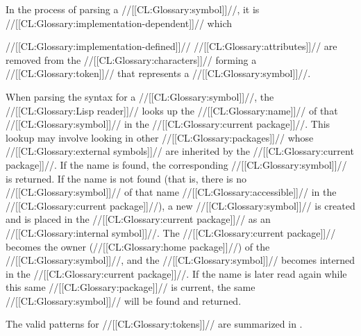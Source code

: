 { In the process of parsing a //[[CL:Glossary:symbol]]//, it is //[[CL:Glossary:implementation-dependent]]// which

//[[CL:Glossary:implementation-defined]]// //[[CL:Glossary:attributes]]// are removed from the //[[CL:Glossary:characters]]// forming a //[[CL:Glossary:token]]// that represents a //[[CL:Glossary:symbol]]//.

When parsing the syntax for a //[[CL:Glossary:symbol]]//, the //[[CL:Glossary:Lisp reader]]// looks up the //[[CL:Glossary:name]]// of that //[[CL:Glossary:symbol]]//  in the //[[CL:Glossary:current package]]//. This lookup may involve looking in other  //[[CL:Glossary:packages]]// whose //[[CL:Glossary:external symbols]]// are inherited by the //[[CL:Glossary:current package]]//.  If the name is found, the corresponding //[[CL:Glossary:symbol]]// is returned.  If the name is not found (that is, there is no //[[CL:Glossary:symbol]]//  of that name //[[CL:Glossary:accessible]]// in the //[[CL:Glossary:current package]]//), a new //[[CL:Glossary:symbol]]// is created and is placed in the //[[CL:Glossary:current package]]// as an //[[CL:Glossary:internal symbol]]//.  The //[[CL:Glossary:current package]]// becomes the owner (//[[CL:Glossary:home package]]//) of the //[[CL:Glossary:symbol]]//,  and the //[[CL:Glossary:symbol]]// becomes interned in the //[[CL:Glossary:current package]]//. If the name is later read again while this same //[[CL:Glossary:package]]// is current, the same //[[CL:Glossary:symbol]]// will be found and returned.

\endsubSection%


The valid patterns for //[[CL:Glossary:tokens]]// are summarized in \thenextfigure. 


}
